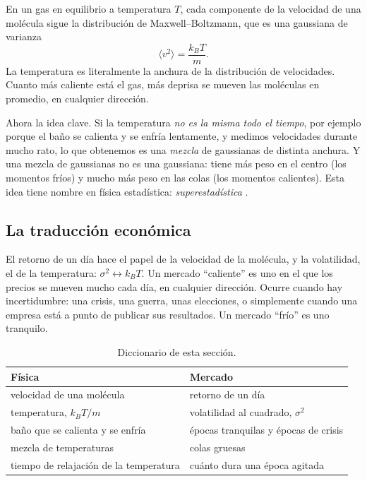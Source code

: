\documentclass[11pt,a4paper]{article}
\begin{document}
En un gas en equilibrio a temperatura $T$, cada componente de la velocidad de una molécula sigue la
distribución de Maxwell--Boltzmann, que es una gaussiana de varianza
\begin{equation}
\langle v^2\rangle=\frac{k_BT}{m}.
\end{equation}
La temperatura es literalmente la anchura de la distribución de velocidades. Cuanto más caliente está el
gas, más deprisa se mueven las moléculas en promedio, en cualquier dirección.

Ahora la idea clave. Si la temperatura \emph{no es la misma todo el tiempo}, por ejemplo porque el baño se
calienta y se enfría lentamente, y medimos velocidades durante mucho rato, lo que obtenemos es una
\emph{mezcla} de gaussianas de distinta anchura. Y una mezcla de gaussianas no es una gaussiana: tiene
más peso en el centro (los momentos fríos) y mucho más peso en las colas (los momentos calientes). Esta
idea tiene nombre en física estadística: \emph{superestadística} \cite{beck2003}.

\subsection{La traducción económica}

El retorno de un día hace el papel de la velocidad de la molécula, y la volatilidad, el de la
temperatura: $\sigma^2\leftrightarrow k_BT$. Un mercado ``caliente'' es uno en el que los precios se
mueven mucho cada día, en cualquier dirección. Ocurre cuando hay incertidumbre: una crisis, una
guerra, unas elecciones, o simplemente cuando una empresa está a punto de publicar sus resultados. Un
mercado ``frío'' es uno tranquilo.

\begin{table}[ht]
\centering\small
\caption{Diccionario de esta sección.}
\begin{tabular}{@{}ll@{}}
\toprule
Física & Mercado \\
\midrule
velocidad de una molécula & retorno de un día\\
temperatura, $k_BT/m$ & volatilidad al cuadrado, $\sigma^2$\\
baño que se calienta y se enfría & épocas tranquilas y épocas de crisis\\
mezcla de temperaturas & colas gruesas\\
tiempo de relajación de la temperatura & cuánto dura una época agitada\\
\bottomrule
\end{tabular}
\end{table}
\end{document}
